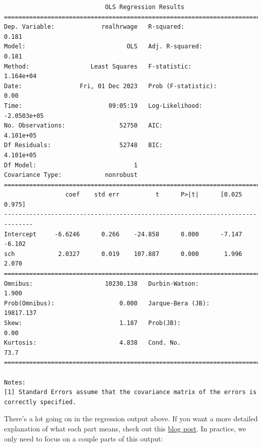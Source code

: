 \documentclass[
  letterpaper,
  DIV=11,
  numbers=noendperiod]{scrreprt}
\begin{document}
\begin{verbatim}
                            OLS Regression Results                            
==============================================================================
Dep. Variable:             realhrwage   R-squared:                       0.181
Model:                            OLS   Adj. R-squared:                  0.181
Method:                 Least Squares   F-statistic:                 1.164e+04
Date:                Fri, 01 Dec 2023   Prob (F-statistic):               0.00
Time:                        09:05:19   Log-Likelihood:            -2.0503e+05
No. Observations:               52750   AIC:                         4.101e+05
Df Residuals:                   52748   BIC:                         4.101e+05
Df Model:                           1                                         
Covariance Type:            nonrobust                                         
==============================================================================
                 coef    std err          t      P>|t|      [0.025      0.975]
------------------------------------------------------------------------------
Intercept     -6.6246      0.266    -24.858      0.000      -7.147      -6.102
sch            2.0327      0.019    107.887      0.000       1.996       2.070
==============================================================================
Omnibus:                    10230.138   Durbin-Watson:                   1.900
Prob(Omnibus):                  0.000   Jarque-Bera (JB):            19817.137
Skew:                           1.187   Prob(JB):                         0.00
Kurtosis:                       4.838   Cond. No.                         73.7
==============================================================================

Notes:
[1] Standard Errors assume that the covariance matrix of the errors is correctly specified.
\end{verbatim}

There's a lot going on in the regression output above. If you want a
more detailed explanation of what each part means, check out this
\href{https://medium.com/swlh/interpreting-linear-regression-through-statsmodels-summary-4796d359035a}{blog
post}. In practice, we only need to focus on a couple parts of this
output:
\end{document}
